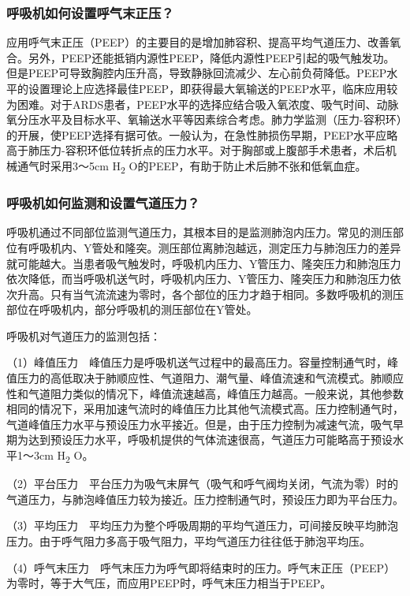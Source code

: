 \subsubsection{呼吸机如何设置呼气末正压？}

应用呼气末正压（PEEP）的主要目的是增加肺容积、提高平均气道压力、改善氧合。另外，PEEP还能抵销内源性PEEP，降低内源性PEEP引起的吸气触发功。但是PEEP可导致胸腔内压升高，导致静脉回流减少、左心前负荷降低。PEEP水平的设置理论上应选择最佳PEEP，即获得最大氧输送的PEEP水平，临床应用较为困难。对于ARDS患者，PEEP水平的选择应结合吸入氧浓度、吸气时间、动脉氧分压水平及目标水平、氧输送水平等因素综合考虑。肺力学监测（压力-容积环）的开展，使PEEP选择有据可依。一般认为，在急性肺损伤早期，PEEP水平应略高于肺压力-容积环低位转折点的压力水平。对于胸部或上腹部手术患者，术后机械通气时采用3～5cm
H\textsubscript{2} O的PEEP，有助于防止术后肺不张和低氧血症。

\subsubsection{呼吸机如何监测和设置气道压力？}

呼吸机通过不同部位监测气道压力，其根本目的是监测肺泡内压力。常见的测压部位有呼吸机内、Y管处和隆突。测压部位离肺泡越远，测定压力与肺泡压力的差异就可能越大。当患者吸气触发时，呼吸机内压力、Y管压力、隆突压力和肺泡压力依次降低，而当呼吸机送气时，呼吸机内压力、Y管压力、隆突压力和肺泡压力依次升高。只有当气流流速为零时，各个部位的压力才趋于相同。多数呼吸机的测压部位在呼吸机内，部分呼吸机的测压部位在Y管处。

呼吸机对气道压力的监测包括：

（1）峰值压力　峰值压力是呼吸机送气过程中的最高压力。容量控制通气时，峰值压力的高低取决于肺顺应性、气道阻力、潮气量、峰值流速和气流模式。肺顺应性和气道阻力类似的情况下，峰值流速越高，峰值压力越高。一般来说，其他参数相同的情况下，采用加速气流时的峰值压力比其他气流模式高。压力控制通气时，气道峰值压力水平与预设压力水平接近。但是，由于压力控制为减速气流，吸气早期为达到预设压力水平，呼吸机提供的气体流速很高，气道压力可能略高于预设水平1～3cm
H\textsubscript{2} O。

（2）平台压力　平台压力为吸气末屏气（吸气和呼气阀均关闭，气流为零）时的气道压力，与肺泡峰值压力较为接近。压力控制通气时，预设压力即为平台压力。

（3）平均压力　平均压力为整个呼吸周期的平均气道压力，可间接反映平均肺泡压力。由于呼气阻力多高于吸气阻力，平均气道压力往往低于肺泡平均压。

（4）呼气末压力　呼气末压力为呼气即将结束时的压力。呼气末正压（PEEP）为零时，等于大气压，而应用PEEP时，呼气末压力相当于PEEP。

